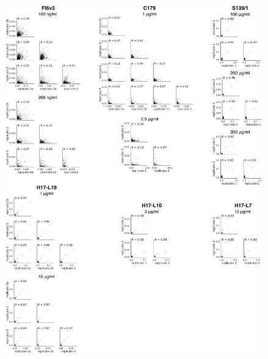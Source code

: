 \documentclass[11pt]{article}
\begin{document}
\begin{suppfigure}
\centerline{\includegraphics[width=0.84\textwidth]{figs/corrs/site_correlations.pdf}}
\caption{\label{suppfig:corr}
{\bf Correlations across experimental replicates.} 
Each point represents one site in HA, and gives the fraction surviving above average across all amino-acid mutations at that site, as calculated using Equation~\ref{eq:avgfracsurvive}.
The replicates are highly correlated for antibodies with strong escape mutations (S139/1, H17-L19, H17-L10, and H17-L7), and reasonably correlated for antibodies with only weak escape mutations (FI6v3 and C179).
}
\end{suppfigure}
\end{document}
